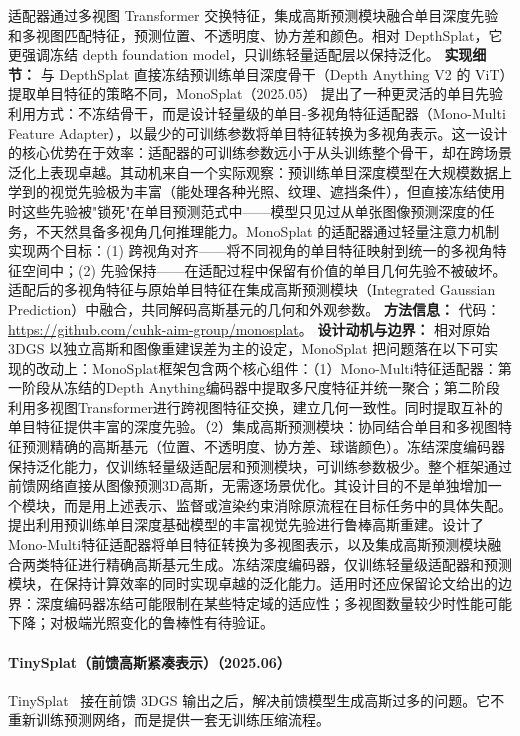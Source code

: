 适配器通过多视图 Transformer 交换特征，集成高斯预测模块融合单目深度先验和多视图匹配特征，预测位置、不透明度、协方差和颜色。相对 DepthSplat，它更强调冻结 depth foundation model，只训练轻量适配层以保持泛化。
\textbf{实现细节：} 与 DepthSplat 直接冻结预训练单目深度骨干（Depth Anything V2 的 ViT）提取单目特征的策略不同，MonoSplat（2025.05） 提出了一种更灵活的单目先验利用方式：不冻结骨干，而是设计轻量级的单目-多视角特征适配器（Mono-Multi Feature Adapter），以最少的可训练参数将单目特征转换为多视角表示。这一设计的核心优势在于效率：适配器的可训练参数远小于从头训练整个骨干，却在跨场景泛化上表现卓越。其动机来自一个实际观察：预训练单目深度模型在大规模数据上学到的视觉先验极为丰富（能处理各种光照、纹理、遮挡条件），但直接冻结使用时这些先验被"锁死"在单目预测范式中——模型只见过从单张图像预测深度的任务，不天然具备多视角几何推理能力。MonoSplat 的适配器通过轻量注意力机制实现两个目标：(1) 跨视角对齐——将不同视角的单目特征映射到统一的多视角特征空间中；(2) 先验保持——在适配过程中保留有价值的单目几何先验不被破坏。适配后的多视角特征与原始单目特征在集成高斯预测模块（Integrated Gaussian Prediction）中融合，共同解码高斯基元的几何和外观参数。
\textbf{方法信息：} 代码：\url{https://github.com/cuhk-aim-group/monosplat}。
\textbf{设计动机与边界：} 相对原始 3DGS 以独立高斯和图像重建误差为主的设定，MonoSplat 把问题落在以下可实现的改动上：MonoSplat框架包含两个核心组件：（1）Mono-Multi特征适配器：第一阶段从冻结的Depth Anything编码器中提取多尺度特征并统一聚合；第二阶段利用多视图Transformer进行跨视图特征交换，建立几何一致性。同时提取互补的单目特征提供丰富的深度先验。（2）集成高斯预测模块：协同结合单目和多视图特征预测精确的高斯基元（位置、不透明度、协方差、球谐颜色）。冻结深度编码器保持泛化能力，仅训练轻量级适配层和预测模块，可训练参数极少。整个框架通过前馈网络直接从图像预测3D高斯，无需逐场景优化。其设计目的不是单独增加一个模块，而是用上述表示、监督或渲染约束消除原流程在目标任务中的具体失配。提出利用预训练单目深度基础模型的丰富视觉先验进行鲁棒高斯重建。设计了Mono-Multi特征适配器将单目特征转换为多视图表示，以及集成高斯预测模块融合两类特征进行精确高斯基元生成。冻结深度编码器，仅训练轻量级适配器和预测模块，在保持计算效率的同时实现卓越的泛化能力。适用时还应保留论文给出的边界：深度编码器冻结可能限制在某些特定域的适应性；多视图数量较少时性能可能下降；对极端光照变化的鲁棒性有待验证。
\paragraph{TinySplat（前馈高斯紧凑表示）（2025.06）}
TinySplat~\cite{2506_09479} 接在前馈 3DGS 输出之后，解决前馈模型生成高斯过多的问题。它不重新训练预测网络，而是提供一套无训练压缩流程。


